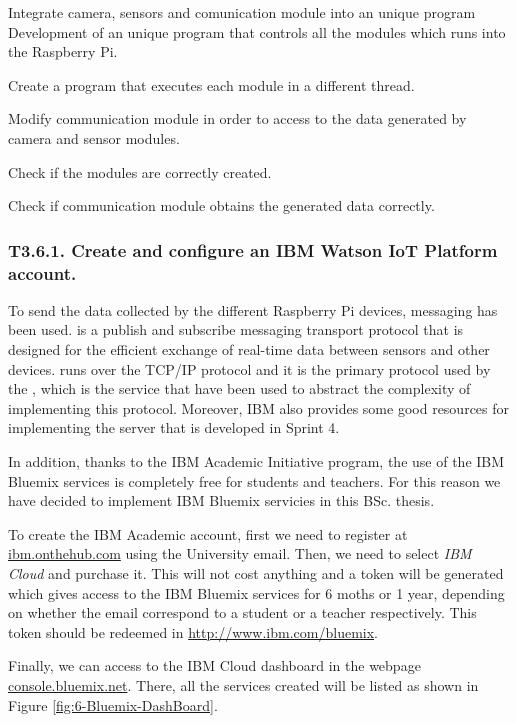 {Integrate camera, sensors and comunication module into an unique program}
{Development of an unique program that controls all the modules which runs into the Raspberry Pi.}
{	\item Create a program that executes each module in a different thread.
	\item Modify communication module in order to access to the data generated by camera and sensor modules.
}{	\item Check if the modules are correctly created.
	\item Check if communication module obtains the generated data correctly.
}

\subsubsection{T3.6.1. Create and configure an IBM Watson IoT Platform account.}

To send the data collected by the different Raspberry Pi devices,  messaging has been used.  is a publish and subscribe messaging transport protocol that is designed for the efficient exchange of real-time data between sensors and other devices.  runs over the TCP/IP protocol and it is the primary protocol used by the , which is the service that have been used to abstract the complexity of implementing this  protocol. Moreover, IBM also provides some good resources for implementing the server that is developed in Sprint 4. 

 In addition, thanks to the IBM Academic Initiative program, the use of the IBM Bluemix services is completely free for students and teachers. For this reason we have decided to implement IBM Bluemix servicies in this \ac{BSc.} thesis.

To create the IBM Academic account, first we need to register at \url{ibm.onthehub.com} using the University email. Then, we need to select \emph{IBM Cloud} and purchase it. This will not cost anything and a token will be generated which gives access to the IBM Bluemix services for 6 moths or 1 year, depending on whether the email correspond to a student or a teacher respectively. This token should be redeemed in \url{http://www.ibm.com/bluemix}. 

Finally, we can access to the IBM Cloud dashboard in the webpage \url{console.bluemix.net}. There, all the services created will be listed as shown in Figure \ref{fig:6-Bluemix-DashBoard}. 

